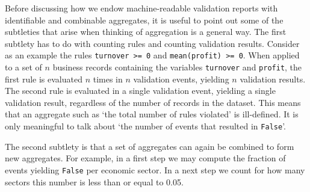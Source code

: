 \documentclass[a4paper, 11pt,titlepage]{article}
\newcommand{\code}[1]{\texttt{#1}}
\newcommand{\onwaar}{{\normalfont \texttt{False}}}
\begin{document}
Before discussing how we endow machine-readable validation reports with
identifiable and combinable aggregates, it is useful to point out some of the
subtleties that arise when thinking of aggregation is a general way. The first
subtlety has to do with counting rules and counting validation results.
Consider as an example the rules \code{turnover >= 0} and \code{mean(profit) >=
0}.  When applied to a set of $n$ business records containing the variables
\code{turnover} and \code{profit}, the first rule is evaluated $n$ times in $n$
validation events, yielding $n$ validation results. The second rule is
evaluated in a single validation event, yielding a single validation result,
regardless of the number of records in the dataset. This means that an
aggregate such as `the total number of rules violated' is ill-defined. It is
only meaningful to talk about `the number of events that resulted in
\onwaar{}'. 

The second subtlety is that a set of aggregates can again be combined to form
new aggregates. For example, in a first step we may compute the fraction of
events yielding \onwaar{} per economic sector. In a next step we count for how
many sectors this number is less than or equal to 0.05.
\end{document}

